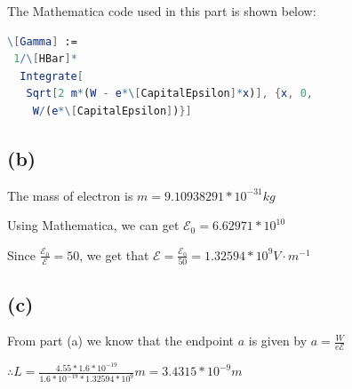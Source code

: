 \documentclass[12pt]{article}
\begin{document}
\begin{spacing}{2.0}
The Mathematica code used in this part is shown below:

\begin{lstlisting}[language=Mathematica,breaklines=true,frame=single]
\[Gamma] :=
 1/\[HBar]*
  Integrate[
   Sqrt[2 m*(W - e*\[CapitalEpsilon]*x)], {x, 0,
    W/(e*\[CapitalEpsilon])}]
\end{lstlisting}

\subsection*{(b)}

The mass of electron is $m=9.10938291*10^{-31} kg$

Using Mathematica, we can get $\mathcal{E}_0 = 6.62971*10^{10}$

Since $\frac{\mathcal{E}_0}{\mathcal{E}}= 50$, we get that $\mathcal{E}= \frac{\mathcal{E}_0}{50} = 1.32594*10^{9} V\cdot m^{-1}$

\subsection*{(c)}

From part (a) we know that the endpoint $a$ is given by $a=\frac{W}{e\mathcal{E}}$ 

$\therefore L =\frac{4.55*1.6*10^{-19}}{1.6*10^{-19}*1.32594*10^{9}} m= 3.4315*10^{-9} m$

\end{spacing}
\end{document}
